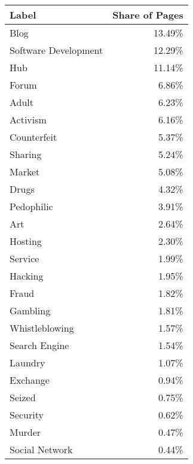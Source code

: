 \iflncs
\begin{center}
    \begin{supertabular*}{\textwidth}{l@{\extracolsep{\fill}}r}
    \textbf{Label}		&	\textbf{Share of Pages}\\
	\hline
	\hline
	Blog		&	13.49\%\\
	\hline
	Software Development	&	12.29\%\\
	\hline
	Hub		&	11.14\%\\
	\hline
	Forum		&	6.86\%\\
	\hline
	Adult		&	6.23\%\\
	\hline
	Activism	&	6.16\%\\
	\hline
	Counterfeit	&	5.37\%\\
	\hline
	Sharing		&	5.24\%\\
	\hline
	Market		&	5.08\%\\
	\hline
	Drugs		&	4.32\%\\
	\hline
	Pedophilic	&	3.91\%\\
	\hline
	Art			&	2.64\%\\
	\hline
	Hosting		&	2.30\%\\
	\hline
	Service		&	1.99\%\\
	\hline
	Hacking		&	1.95\%\\
	\hline
	Fraud		&	1.82\%\\
	\hline
	Gambling	&	1.81\%\\
	\hline
	Whistleblowing			&	1.57\%\\
	\hline
	Search Engine			&	1.54\%\\
	\hline
	Laundry		&	1.07\%\\
	\hline
	Exchange	&	0.94\%\\
	\hline
	Seized		&	0.75\%\\
	\hline
	Security	&	0.62\%\\
	\hline
	Murder		&	0.47\%\\
	\hline
	Social Network			&	0.44\%\\
    \end{supertabular*}
\end{center}
\fi


